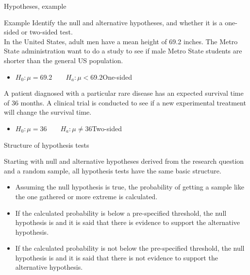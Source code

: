 \documentclass[xcolor=table]{beamer}
\begin{document}
\begin{frame}{Hypotheses, example}
\begin{exampleblock}{Example}
\large
Identify the null and alternative hypotheses, and whether it is a one-sided or two-sided test.\\
\pause\medskip
In the United States, adult men have a mean height of 69.2 inches. The Metro State administration want to do a study to see if male Metro State students are shorter than the general US population.

\begin{itemize}
\pause\item $H_0: \mu = 69.2 \qquad H_a: \mu < 69.2$\qquad One-sided

\end{itemize}

\pause\medskip
A patient diagnosed with a particular rare disease has an expected survival time of 36 months. A clinical trial is conducted to see if a new experimental treatment will change the survival time.
\begin{itemize}
\pause\item $H_0: \mu = 36 \qquad H_a: \mu \ne 36$\qquad Two-sided
\end{itemize}

\end{exampleblock}
\end{frame}

\begin{frame}{Structure of hypothesis tests}
\begin{block}{}
\large
Starting with null and alternative hypotheses derived from the research question and a random sample, all hypothesis tests have the same basic structure.
\begin{itemize}
\pause\item Assuming the null hypothesis is true, the probability of getting a sample like the one gathered or more extreme is calculated.

\pause\item If the calculated probability is below a pre-specified threshold, the null hypothesis is  and it is said that there is evidence to support the alternative hypothesis.

\pause\item If the calculated probability is not below the pre-specified threshold, the null hypothesis is  and it is said that there is not evidence to support the alternative hypothesis.
\end{itemize}
\end{block}
\end{frame}
\end{document}
